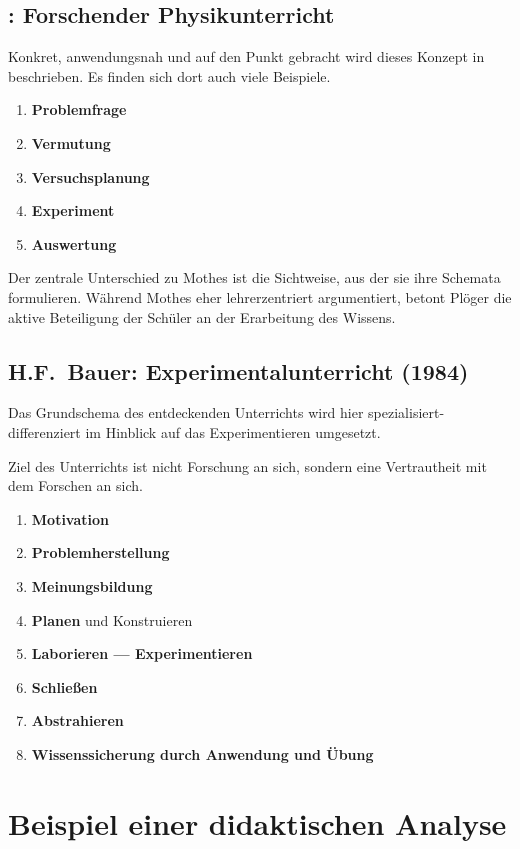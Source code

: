 \section{\textcite{Ploeger}: Forschender Physikunterricht}
Konkret, anwendungsnah und auf den Punkt gebracht wird dieses Konzept in
\textcite{Ploeger} beschrieben.
Es finden sich dort auch viele Beispiele.
\begin{enumerate}
	\item {\bf Problemfrage}
	\item {\bf Vermutung}
	\item {\bf Versuchsplanung}
	\item {\bf Experiment}
	\item {\bf Auswertung}
\end{enumerate}
Der zentrale Unterschied zu Mothes ist die Sichtweise, aus der sie ihre Schemata formulieren. Während Mothes eher lehrerzentriert argumentiert, betont Plöger die aktive Beteiligung der Schüler an der Erarbeitung des Wissens.

\section{H.F.\ Bauer: Experimentalunterricht (1984)}
Das Grundschema des entdeckenden Unterrichts wird
hier spezialisiert-differenziert im Hinblick auf
das Experimentieren umgesetzt.

\mip Ziel des Unterrichts ist nicht Forschung an sich, sondern eine
Vertrautheit mit dem Forschen an sich.
	\begin{enumerate}
	\item {\bf Motivation}
	\item {\bf Problemherstellung}
	\item {\bf Meinungsbildung}
	\item {\bf Planen} und Konstruieren
	\item {\bf Laborieren --- Experimentieren}
	\item {\bf Schlie{\ss}en}
	\item {\bf Abstrahieren}
	\item {\bf Wissenssicherung durch Anwendung und \"{U}bung}
\end{enumerate}


\chapter{Beispiel einer didaktischen Analyse}\label{A_DidAna}
